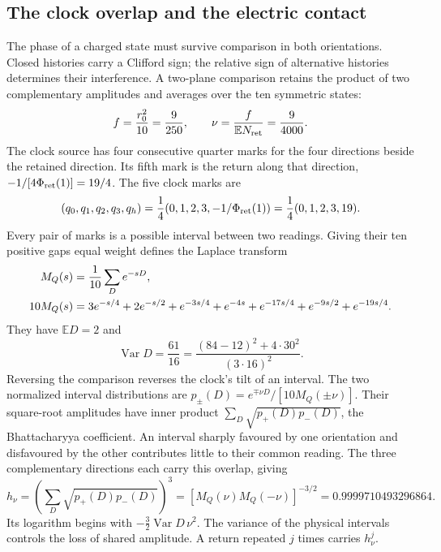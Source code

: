 \documentclass[aps,prx,onecolumn,10pt,notitlepage,nofootinbib,longbibliography]{revtex4-2}
\numberwithin{equation}{section}
\numberwithin{table}{section}
\newcommand{\EE}{\mathbb E}
\newcommand{\Var}{\operatorname{Var}}
\newcommand{\hover}{h_\nu}
\newcommand{\Phis}{\Phi_{\rm ret}}
\begin{document}
\subsection{The clock overlap and the electric contact}
The phase of a charged state must survive comparison in both orientations. Closed histories carry a Clifford sign; the relative sign of alternative histories determines their interference. A two-plane comparison retains the product of two complementary amplitudes and averages over the ten symmetric states:
\begin{equation}
 f=\frac{r_0^2}{10}=\frac9{250},\qquad
 \nu=\frac f{\EE N_{\rm ret}}=\frac9{4000}.
 \label{eq:fnu}
\end{equation}
The clock source has four consecutive quarter marks for the four directions beside the retained direction. Its fifth mark is the return along that direction, $-1/[4\Phis(1)]=19/4$. The five clock marks are
\begin{equation}
 (q_0,q_1,q_2,q_3,q_h)=\frac14(0,1,2,3,-1/\Phis(1))
 =\frac14(0,1,2,3,19).
 \label{eq:clockmarks}
\end{equation}
Every pair of marks is a possible interval between two readings. Giving their ten positive gaps equal weight defines the Laplace transform
\begin{align}
 M_Q(s)&=\frac1{10}\sum_D e^{-sD},\notag\\
 10M_Q(s)&=3e^{-s/4}+2e^{-s/2}+e^{-3s/4}
 +e^{-4s}+e^{-17s/4}+e^{-9s/2}+e^{-19s/4}.
 \label{eq:MQ}
\end{align}
They have $\EE D=2$ and
\begin{equation}
 \Var D=\frac{61}{16}
 =\frac{(84-12)^2+4\cdot30^2}{(3\cdot16)^2}.
\end{equation}
Reversing the comparison reverses the clock's tilt of an interval. The two normalized interval distributions are $p_\pm(D)=e^{\mp\nu D}/[10M_Q(\pm\nu)]$. Their square-root amplitudes have inner product $\sum_D\sqrt{p_+(D)p_-(D)}$, the Bhattacharyya coefficient. An interval sharply favoured by one orientation and disfavoured by the other contributes little to their common reading. The three complementary directions each carry this overlap, giving
\begin{equation}
 \hover=\left(\sum_D\sqrt{p_+(D)p_-(D)}\right)^3
 =[M_Q(\nu)M_Q(-\nu)]^{-3/2}
 =0.9999710493296864.
 \label{eq:h}
\end{equation}
Its logarithm begins with $-\tfrac32\Var D\,\nu^2$. The variance of the physical intervals controls the loss of shared amplitude. A return repeated $j$ times carries $\hover^j$.
\end{document}

